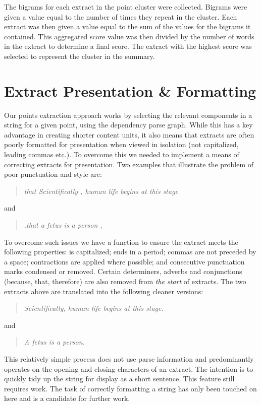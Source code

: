     The bigrams for each extract in the point cluster were collected. Bigrams were given a value equal to the number of times they repeat in the cluster. Each extract was then given a value equal to the sum of the values for the bigrams it contained. This aggregated score value was then divided by the number of words in the extract to determine a final score. The extract with the highest score was selected to represent the cluster in the summary.

  \section{Extract Presentation \& Formatting}
    Our points extraction approach works by selecting the relevant components in a string for a given point, using the dependency parse graph. While this has a key advantage in creating shorter content units, it also means that extracts are often poorly formatted for presentation when viewed in isolation (not capitalized, leading commas etc.). To overcome this we needed to implement a means of correcting extracts for presentation. Two examples that illustrate the problem of poor punctuation and style are: \blockquote{\textit{that Scientifically , human life begins at this stage}} and \blockquote{\textit{.that a fetus is a person ,}}.

    To overcome such issues we have a function to ensure the extract meets the following properties: is capitalized; ends in a period; commas are not preceded by a space; contractions are applied where possible; and consecutive punctuation marks condensed or removed. Certain determiners, adverbs and conjunctions (because, that, therefore) are also removed from \textit{the start} of extracts. The two extracts above are translated into the following cleaner versions: \blockquote{\textit{Scientifically, human life begins at this stage.}} and \blockquote{\textit{A fetus is a person.}}.

    This relatively simple process does not use parse information and predominantly operates on the opening and closing characters of an extract. The intention is to quickly tidy up the string for display as a short sentence. This feature still requires work. The task of correctly formatting a string has only been touched on here and is a candidate for further work.

